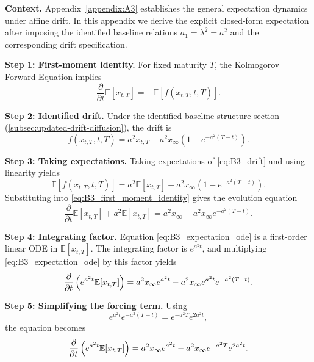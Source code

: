 \documentclass[12pt]{article}
\theoremstyle{statementstyle}
\begin{document}
\begin{appendices}
\medskip
\noindent\textbf{Context.}
Appendix~\ref{appendix:A3} establishes the general expectation dynamics under affine
drift.  In this appendix we derive the explicit closed-form expectation
after imposing the identified baseline relations
$a_1 = \lambda^2 = a^2$ and the corresponding drift specification.

\medskip
\noindent\textbf{Step 1: First-moment identity.}
For fixed maturity $T$, the Kolmogorov Forward Equation implies
\begin{equation}
\frac{\partial}{\partial t}\mathbb{E}[x_{t,T}]
=
-\mathbb{E}\!\left[f(x_{t,T},t,T)\right].
\label{eq:B3_first_moment_identity}
\tag{B.3.1}
\end{equation}

\medskip
\noindent\textbf{Step 2: Identified drift.}
Under the identified baseline structure section (\ref{subsec:updated-drift-diffusion}), the drift is
\begin{equation}
f(x_{t,T},t,T)
=
a^{2}x_{t,T}
-
a^{2}x_{\infty}\!\left(1-e^{-a^{2}(T-t)}\right).
\label{eq:B3_drift}
\tag{B.3.2}
\end{equation}

\medskip
\noindent\textbf{Step 3: Taking expectations.}
Taking expectations of \ref{eq:B3_drift} and using linearity yields
\[
\mathbb{E}[f(x_{t,T},t,T)]
=
a^{2}\mathbb{E}[x_{t,T}]
-
a^{2}x_{\infty}\!\left(1-e^{-a^{2}(T-t)}\right).
\]
Substituting into \eqref{eq:B3_first_moment_identity} gives the evolution
equation
\begin{equation}
\frac{\partial}{\partial t}\mathbb{E}[x_{t,T}]
+
a^{2}\mathbb{E}[x_{t,T}]
=
a^{2}x_{\infty}
-
a^{2}x_{\infty}e^{-a^{2}(T-t)}.
\label{eq:B3_expectation_ode}
\tag{B.3.3}
\end{equation}

\medskip
\noindent\textbf{Step 4: Integrating factor.}
Equation \eqref{eq:B3_expectation_ode} is a first-order linear ODE in
$\mathbb{E}[x_{t,T}]$.  The integrating factor is $e^{a^{2}t}$, and
multiplying \eqref{eq:B3_expectation_ode} by this factor yields
\begin{equation}
\frac{\partial}{\partial t}
\left(
e^{a^{2}t}\mathbb{E}[x_{t,T}]
\right)
=
a^{2}x_{\infty}e^{a^{2}t}
-
a^{2}x_{\infty}e^{a^{2}t}e^{-a^{2}(T-t)}.
\notag
\end{equation}

\medskip
\noindent\textbf{Step 5: Simplifying the forcing term.}
Using
\[
e^{a^{2}t}e^{-a^{2}(T-t)} = e^{-a^{2}T}e^{2a^{2}t},
\]
the equation becomes
\begin{equation}
\frac{\partial}{\partial t}
\left(
e^{a^{2}t}\mathbb{E}[x_{t,T}]
\right)
=
a^{2}x_{\infty}e^{a^{2}t}
-
a^{2}x_{\infty}e^{-a^{2}T}e^{2a^{2}t}.
\notag
\end{equation}


\end{appendices}
\end{document}
